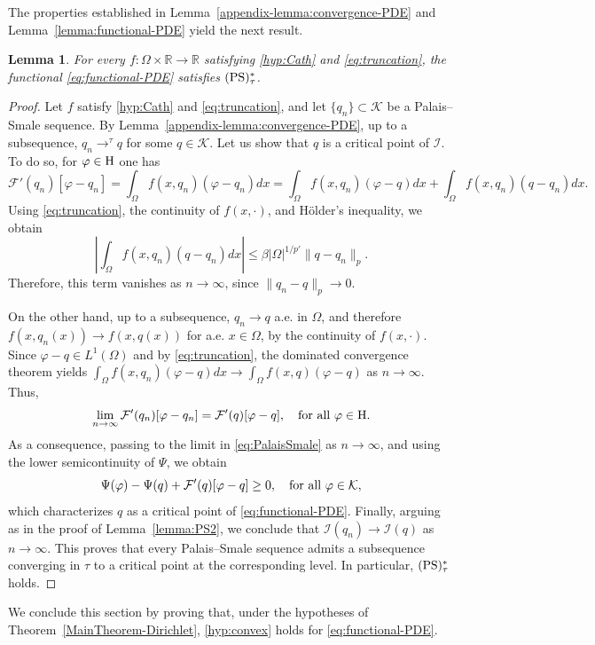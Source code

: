 \documentclass{article}
\newcommand{\boK}{\mathcal{K}}
\newcommand{\boI}{\mathcal{I}}
\newcommand{\boF}{\mathcal{F}}
\newcommand{\Hilb}{{\textnormal H}}
\newcommand{\PS}{(\textnormal{PS})^{*}_\tau}
\newtheorem{lemma}{Lemma}[section]
\theoremstyle{definition}
\begin{document}
The properties established in Lemma~\ref{appendix-lemma:convergence-PDE} and Lemma~\ref{lemma:functional-PDE} yield the next result.
\begin{lemma}\label{lemma:PS-PDE}
For every $f:\Omega\times\mathbb{R}\to\mathbb{R}$ satisfying \eqref{hyp:Cath} and \eqref{eq:truncation}, the functional \eqref{eq:functional-PDE} satisfies $\PS$.
\end{lemma}
\begin{proof}
Let $f$ satisfy  \eqref{hyp:Cath} and \eqref{eq:truncation}, and let $\{q_n\}\subset\boK$ be a Palais--Smale sequence. By Lemma~\ref{appendix-lemma:convergence-PDE}, up to a subsequence, $q_n\to^\tau q$ for some $q\in\boK$. Let us show that $q$ is a critical point of $\boI$. To do so, for $\varphi\in\Hilb$ one has 
\begin{equation}\label{eq:F'-PDE}
    \boF'(q_n)[\varphi-q_n]=\int_\Omega f(x,q_n)(\varphi-q_n )dx=\int_\Omega f(x,q_n)(\varphi-q)dx+\int_\Omega f(x,q_n)(q-q_n )dx.
\end{equation}
Using \eqref{eq:truncation}, the continuity of $f(x,\cdot)$, and H\"older's inequality, we obtain
\begin{equation}
    \left|\int_\Omega f(x,q_n)(q-q_n)dx\right|\leq\beta |\Omega|^{1/{p'}}\|q-q_n\|_p.
\end{equation}
Therefore, this term vanishes as $n\to\infty$, since $\|q_n-q\|_p\to 0$.

On the other hand, up to a subsequence, $q_n\to q$ a.e. in $\Omega$, and therefore $f(x,q_n(x))\to f(x,q(x))$ for a.e. $x\in\Omega$, by the continuity of $f(x,\cdot)$. Since $\varphi-q\in L^1(\Omega)$ and by \eqref{eq:truncation}, the dominated convergence theorem yields $\int_\Omega f(x,q_n)(\varphi-q)dx\to\int_\Omega f(x,q)(\varphi-q)$ as $n\to\infty$. Thus,
\begin{equation}
    \lim_{n\to\infty}\boF'(q_n)[\varphi-q_n]=\boF'(q)[\varphi-q],\quad\hbox{for all }\varphi\in\Hilb.
\end{equation}
As a consequence, passing to the limit in \eqref{eq:PalaisSmale} as $n\to\infty$, and using the lower semicontinuity of $\Psi$, we obtain
\begin{equation}
    \Psi(\varphi)-\Psi(q)+\boF'(q)[\varphi-q]\geq0,\quad\hbox{for all }\varphi\in \boK,
\end{equation}
which characterizes $q$ as a critical point of \eqref{eq:functional-PDE}. Finally, arguing as in the proof of Lemma~\ref{lemma:PS2}, we conclude that $\boI(q_n)\to\boI(q)$ as $n\to\infty$. This proves that every Palais--Smale sequence admits a subsequence converging in $\tau$ to a critical point at the corresponding level. In particular, $\PS$ holds.
\end{proof}
We conclude this section by proving that, under the hypotheses of Theorem~\ref{MainTheorem-Dirichlet}, \eqref{hyp:convex} holds for \eqref{eq:functional-PDE}. 
\end{document}
